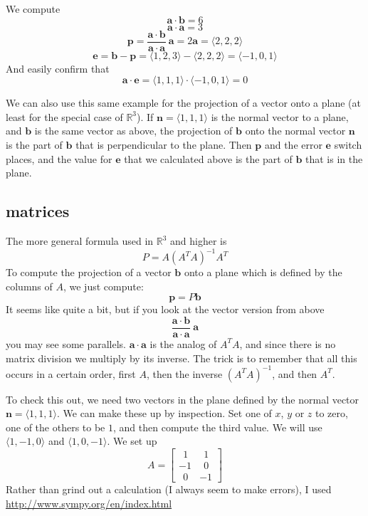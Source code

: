 \documentclass[11pt, oneside]{article}   	%
\begin{document}
We compute 
\[ \mathbf{a} \cdot \mathbf{b} = 6 \]
\[ \mathbf{a} \cdot \mathbf{a} = 3 \]
\[ \mathbf{p} =  \frac{\mathbf{a} \cdot \mathbf{b}}{\mathbf{a} \cdot \mathbf{a} }  \ \mathbf{a} = 2 \mathbf{a} = \langle 2, 2, 2 \rangle \]
\[ \mathbf{e} = \mathbf{b} - \mathbf{p} = \langle 1, 2, 3 \rangle -  \langle 2, 2, 2 \rangle =  \langle -1, 0, 1 \rangle \]
And easily confirm that
\[ \mathbf{a} \cdot \mathbf{e} = \langle 1, 1, 1 \rangle \cdot \langle -1, 0, 1 \rangle = 0 \]

We can also use this same example for the projection of a vector onto a plane (at least for the special case of $\mathbb{R}^3$).  If $\mathbf{n} = \langle 1, 1, 1 \rangle$ is the normal vector to a plane, and $\mathbf{b}$ is the same vector as above, the projection of $\mathbf{b}$ onto the normal vector $\mathbf{n}$ is the part of $\mathbf{b}$ that is perpendicular to the plane.  Then $\mathbf{p}$ and the error $\mathbf{e}$ switch places, and the value for $\mathbf{e}$ that we calculated above is the part of $\mathbf{b}$ that is in the plane.
\subsection*{matrices}
The more general formula used in $\mathbb{R}^3$ and higher is 
\[ P = A(A^T A)^{-1} A^T \]
To compute the projection of a vector $\mathbf{b}$ onto a plane which is defined by the columns of $A$, we just compute:
\[ \mathbf{p} = P \mathbf{b} \]
It seems like quite a bit, but if you look at the vector version from above
\[ \frac{\mathbf{a} \cdot \mathbf{b}}{\mathbf{a} \cdot \mathbf{a} }  \ \mathbf{a} \]
you may see some parallels.  $\mathbf{a} \cdot \mathbf{a}$ is the analog of $A^T A$, and since there is no matrix division we multiply by its inverse.  The trick is to remember that all this occurs in a certain order, first $A$, then the inverse $(A^T A)^{-1}$, and then $A^T$.

To check this out, we need two vectors in the plane defined by the normal vector $\mathbf{n} = \langle 1, 1, 1 \rangle$.  We can make these up by inspection.  Set one of $x$, $y$ or $z$ to zero, one of the others to be $1$, and then compute the third value.  We will use $\langle 1, -1, 0 \rangle$ and $\langle 1, 0, -1 \rangle$.  We set up
\[ A =
\begin{bmatrix}
\ \ 1 & \ \ 1 \\
-1 & \ \ 0 \\
\ \ 0 & -1 
\end{bmatrix}
\]
Rather than grind out a calculation (I always seem to make errors), I used 
\url{http://www.sympy.org/en/index.html}
\end{document}
